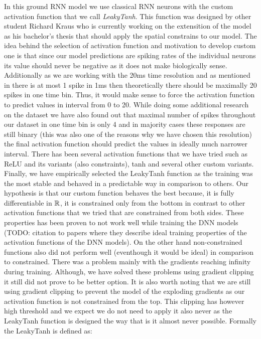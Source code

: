 In this ground RNN model we use classical RNN neurons with the custom activation function that we call \emph{LeakyTanh}. This function was designed by other student Richard Kraus who is currently working on the extensition of the model as his bachelor's thesis that should apply the spatial constrains to our model. The idea behind the selection of activation function and motivation to develop custom one is that since our model predictions are spiking rates of the individual neurons its value should never be negative as it does not make biologically sense. Additionally as we are working with the 20ms time resolution and as mentioned in \citet{dayan2005theoretical} there is at most 1 spike in 1ms then theoretically there should be maximally 20 spikes in one time bin. Thus, it would make sense to force the activation function to predict values in interval from 0 to 20. While doing some additional research on the dataset we have also found out that maximal number of spikes throughout our dataset in one time bin is only 4 and in majority cases these responses are still binary (this was also one of the reasons why we have chosen this resolution) the final activation function should predict the values in ideally much narrower interval. There has been several activation functions that we have tried such as ReLU and its variants (also constraints), tanh and several other custom variants. Finally, we have empirically selected the LeakyTanh function as the training was the most stable and behaved in a predictable way in comparison to others. Our hypothesis is that our custom function behaves the best because, it is fully differentiable in $\mathbb{R}$, it is constrained only from the bottom in contrast to other activation functions that we tried that are constrained from both sides. These properties has been proven to not work well while training the DNN models (TODO: citation to papers where they describe ideal training properties of the activation functions of the DNN models). On the other hand non-constrained functions also did not perform well (eventhough it would be ideal) in comparison to constrained. There was a problem mainly with the gradients reaching infinity during training. Although, we have solved these problems using gradient clipping it still did not prove to be better option. It is also worth noting that we are still using gradient clipping to prevent the model of the exploding gradients as our activation function is not constrained from the top. This clipping has however high threshold and we expect we do not need to apply it also never as the LeakyTanh function is designed the way that is it almost never possible. Formally the LeakyTanh is defined as:


